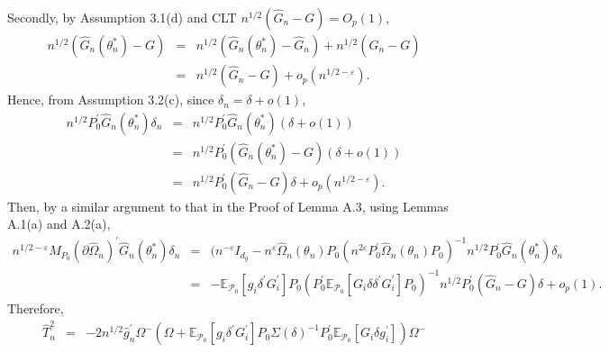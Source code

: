 \documentclass[hidelinks, 11 pt, a4paper, pdflatex]{article}
\begin{document}
{   Secondly, by Assumption 3.1(d) and CLT $n^{1/2}(\hat{G}_{n} - G) = O_{p}(1)$,
    \begin{eqnarray*}
     n^{1/2}(\hat{G}_{n}(\theta _{n}^{\ast })-G) & = & n^{1/2}(\hat{G}_{n}(\theta_{n}^{\ast}) - \hat{G}_{n})
                                                        + n^{1/2}(\hat{G}_{n} - G) \\
                                                 & = & n^{1/2}(\hat{G}_{n} - G) + o_{p}(n^{1/2-\varepsilon }).
    \end{eqnarray*}%
   Hence, from Assumption 3.2(c), since $\delta_{n} = \delta +o(1)$,
    \begin{eqnarray*}
     n^{1/2}P_{0}^{\prime}\hat{G}_{n}(\theta_{n}^{\ast})\delta_{n} & = & n^{1/2}P_{0}^{\prime}\hat{G}_{n}(\theta_{n}^{\ast})(\delta + o(1)) \\
                                                                   & = & n^{1/2}P_{0}^{\prime}(\hat{G}_{n}(\theta_{n}^{\ast}) - G)(\delta + o(1)) \\
                                                                   & = & n^{1/2}P_{0}^{\prime}(\hat{G}_{n} - G)\delta + o_{p}(n^{1/2-\varepsilon}).
    \end{eqnarray*}%
   Then, by a similar argument to that in the Proof of Lemma A.3, using Lemmas A.1(a) and A.2(a),
    \begin{eqnarray*}
     n^{1/2-\varepsilon }M_{P_{0}}(\partial \hat{\Omega}_{n})^{\prime}\hat{G}_{n}(\theta_{n}^{\ast})\delta _{n}
      & = &
            (n^{-\varepsilon}I_{d_{g}} - n^{\varepsilon}\hat{\Omega}_{n}(\theta_{n})P_{0}
             (n^{2\varepsilon}P_{0}^{\prime}\hat{\Omega}_{n}(\theta_{n})P_{0})^{-1}
             n^{1/2}P_{0}^{\prime}\hat{G}_{n}(\theta_{n}^{\ast})\delta_{n} \\
      & = &
            - \mathbb{E}_{\mathcal{P}_{0}}[g_{i}\delta^{\prime}G_{i}^{\prime}]P_{0}
               (P_{0}^{\prime}\mathbb{E}_{\mathcal{P}_{0}}[G_{i}\delta \delta ^{\prime}G_{i}^{\prime}]P_{0})^{-1}
               n^{1/2}P_{0}^{\prime}(\hat{G}_{n} - G)\delta + o_{p}(1).
    \end{eqnarray*}%
   Therefore,
    \begin{eqnarray}
     \hat{T}_{n}^{2} & = & -2n^{1/2}\hat{g}_{n}^{\prime}\Omega ^{-}
                             (\Omega + \mathbb{E}_{\mathcal{P}_{0}}[g_{i}\delta^{\prime}G_{i}^{\prime}]
                              P_{0}\Sigma(\delta)^{-1}P_{0}^{\prime}
                              \mathbb{E}_{\mathcal{P}_{0}}[G_{i}\delta g_{i}^{\prime}])\Omega ^{-} \nonumber \\

\end{eqnarray}}
\end{document}
